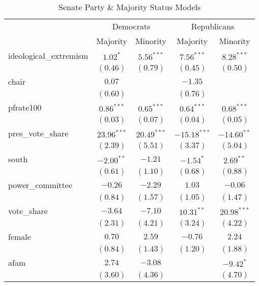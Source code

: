 \documentclass[12pt]{article}
\begin{document}
\begin{table}
	\begin{center}
		\caption{Senate Party \& Majority Status Models}
		\begin{tabular}{l c c c c }
			\hline
			& \multicolumn{2}{c}{Democrats} & \multicolumn{2}{c}{Republicans} \\
			\cline{2-5}
			& Majority & Minority & Majority & Minority \\
			\hline
			ideological\_extremism & $1.02^{*}$    & $5.56^{***}$  & $7.56^{***}$   & $8.28^{***}$  \\
			& $(0.46)$      & $(0.79)$      & $(0.45)$       & $(0.50)$      \\
			chair                  & $0.07$        &               & $-1.35$        &               \\
			& $(0.60)$      &               & $(0.76)$       &               \\
			pfrate100              & $0.86^{***}$  & $0.65^{***}$  & $0.64^{***}$   & $0.68^{***}$  \\
			& $(0.03)$      & $(0.07)$      & $(0.04)$       & $(0.05)$      \\
			pres\_vote\_share      & $23.96^{***}$ & $20.49^{***}$ & $-15.18^{***}$ & $-14.60^{**}$ \\
			& $(2.39)$      & $(5.51)$      & $(3.37)$       & $(5.04)$      \\
			south                  & $-2.00^{**}$  & $-1.21$       & $-1.54^{*}$    & $2.69^{**}$   \\
			& $(0.61)$      & $(1.10)$      & $(0.68)$       & $(0.88)$      \\
			power\_committee       & $-0.26$       & $-2.29$       & $1.03$         & $-0.06$       \\
			& $(0.84)$      & $(1.57)$      & $(1.05)$       & $(1.47)$      \\
			vote\_share            & $-3.64$       & $-7.10$       & $10.31^{**}$   & $20.98^{***}$ \\
			& $(2.31)$      & $(4.21)$      & $(3.24)$       & $(4.22)$      \\
			female                 & $0.70$        & $2.59$        & $-0.76$        & $2.24$        \\
			& $(0.84)$      & $(1.43)$      & $(1.20)$       & $(1.88)$      \\
			afam                   & $2.74$        & $-3.08$       &                & $-9.42^{*}$   \\
			& $(3.60)$      & $(4.36)$      &                & $(4.70)$      \\

\end{tabular}
\end{center}
\end{table}
\end{document}
